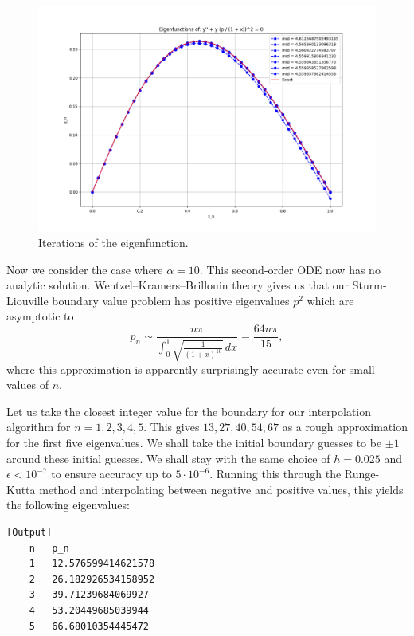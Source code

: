 \documentclass{article}
\begin{document}
\begin{figure}
    \centering
    \includegraphics[width=1.0\textwidth]{images/eigenfunction.png}
    \caption{Iterations of the eigenfunction.}
\end{figure}

Now we consider the case where \(\alpha = 10\). This second-order ODE now has no analytic solution. Wentzel–Kramers–Brillouin theory gives us that our Sturm-Liouville boundary value problem has positive eigenvalues \(p^2\) which are asymptotic to
\[ p_n \sim \frac{n \pi}{\int_0^1 \sqrt{\frac{1}{(1+x)^{10}}}\,dx} = \frac{64n\pi}{15}, \]
where this approximation is apparently surprisingly accurate even for small values of \(n\).

Let us take the closest integer value for the boundary for our interpolation algorithm for \(n = 1,2,3,4,5\). This gives \(13, 27, 40, 54, 67\) as a rough approximation for the first five eigenvalues. We shall take the initial boundary guesses to be \(\pm 1\) around these initial guesses. We shall stay with the same choice of \(h = 0.025\) and \(\epsilon < 10^{-7}\) to ensure accuracy up to \(5\cdot 10^{-6}\). Running this through the Runge-Kutta method and interpolating between negative and positive values, this yields the following eigenvalues:

\begin{verbatim}[Output]
    n   p_n
    1   12.576599414621578
    2   26.182926534158952
    3   39.71239684069927
    4   53.20449685039944
    5   66.68010354445472
\end{verbatim}
\end{document}
